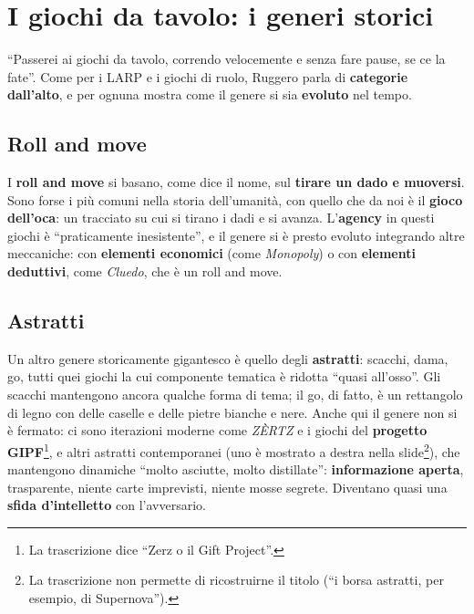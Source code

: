 \section{I giochi da tavolo: i generi storici}
\label{a2:sec:tavolo}



``Passerei ai giochi da tavolo, correndo velocemente e senza fare pause, se ce la
fate''. Come per i LARP e i giochi di ruolo, Ruggero parla di
\textbf{categorie dall'alto}, e per ognuna mostra come il genere si sia
\textbf{evoluto} nel tempo.

\subsection{Roll and move}

I \textbf{roll and move} si basano, come dice il nome, sul \textbf{tirare un
dado e muoversi}. Sono forse i più comuni nella storia dell'umanità, con quello
che da noi è il \textbf{gioco dell'oca}: un tracciato su cui si tirano i dadi e
si avanza. L'\textbf{agency} in questi giochi è ``praticamente inesistente'', e
il genere si è presto evoluto integrando altre meccaniche: con
\textbf{elementi economici} (come \emph{Monopoly}) o con \textbf{elementi
deduttivi}, come \emph{Cluedo}, che è un roll and move.

\subsection{Astratti}

Un altro genere storicamente gigantesco è quello degli \textbf{astratti}:
scacchi, dama, go, tutti quei giochi la cui componente tematica è ridotta
``quasi all'osso''. Gli scacchi mantengono ancora qualche forma di tema; il go, di
fatto, è un rettangolo di legno con delle caselle e delle pietre bianche e nere.
Anche qui il genere non si è fermato: ci sono iterazioni moderne come
\emph{ZÈRTZ} e i giochi del \textbf{progetto GIPF}\footnote{La trascrizione dice
``Zerz o il Gift Project''.}, e altri astratti contemporanei (uno è mostrato a
destra nella slide\footnote{La trascrizione non permette di ricostruirne il
titolo (``i borsa astratti, per esempio, di Supernova'').}), che mantengono
dinamiche ``molto asciutte, molto distillate'': \textbf{informazione aperta},
trasparente, niente carte imprevisti, niente mosse segrete. Diventano quasi una
\textbf{sfida d'intelletto} con l'avversario.

